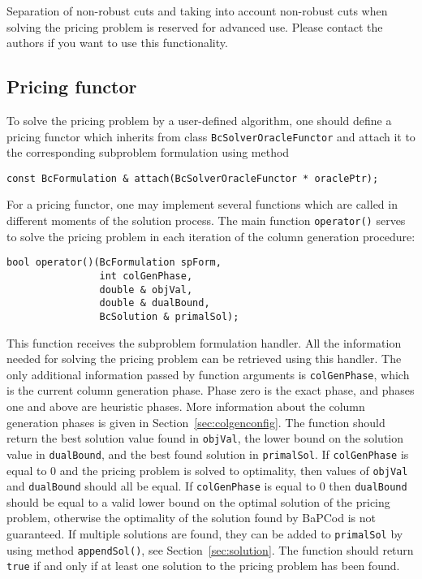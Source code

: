 \documentclass[10pt,a4paper]{article}
\newcommand{\bc}{BaPCod\xspace}
\begin{document}
Separation of non-robust cuts and taking into account non-robust cuts when solving the pricing problem is reserved for
advanced use. Please contact the authors if you want to use this functionality.

\subsection{Pricing functor}
\label{sec:pricing}

To solve the pricing problem by a user-defined algorithm, one should define a pricing functor which inherits from class
\verb+BcSolverOracleFunctor+ and attach it to the corresponding subproblem formulation using method
\begin{lstlisting}
const BcFormulation & attach(BcSolverOracleFunctor * oraclePtr);
\end{lstlisting}

For a pricing functor, one may implement several functions which are called in different moments of the solution
process. The main function \verb+operator()+ serves to solve the pricing problem in each iteration of the column
generation procedure:
\begin{lstlisting}
bool operator()(BcFormulation spForm,
                int colGenPhase, 
                double & objVal,
                double & dualBound,
                BcSolution & primalSol);
\end{lstlisting}
This function receives the subproblem formulation handler. All the information needed for solving the pricing problem
can be retrieved using this handler. The only additional information passed by function arguments is \verb+colGenPhase+,
which is the current column generation phase. Phase zero is the exact phase, and phases one and above are heuristic
phases. More information about the column generation phases is given in Section~\ref{sec:colgenconfig}. The function
should return the best solution value found in \verb+objVal+, the lower bound on the solution value in \verb+dualBound+,
and the best found solution in \verb+primalSol+. If \verb+colGenPhase+ is equal to $0$ and the pricing problem is solved
to optimality, then values of \verb+objVal+ and \verb+dualBound+ should all be equal. If \verb+colGenPhase+ is equal to
$0$ then \verb+dualBound+ should be equal to a valid lower bound on the optimal solution of the pricing problem,
otherwise the optimality of the solution found by \bc is not guaranteed. If multiple solutions are found, they can be
added to \verb+primalSol+ by using method \verb+appendSol()+, see Section~\ref{sec:solution}. The function should return
\verb+true+ if and only if at least one solution to the pricing problem has been found.
\end{document}

